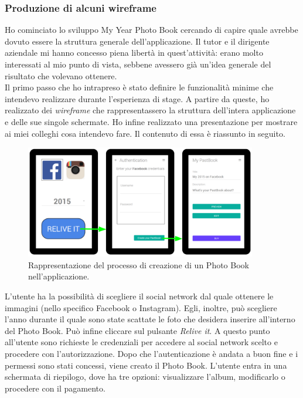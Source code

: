 			\subsubsection{Produzione di alcuni wireframe}
				Ho cominciato lo sviluppo My Year Photo Book cercando di capire quale avrebbe dovuto essere la struttura generale
				dell'applicazione. Il tutor e il dirigente aziendale mi hanno concesso piena libertà in quest'attività: erano molto
				interessati al mio punto di vista, sebbene avessero già un'idea generale del risultato che volevano ottenere.\\
				Il primo passo che ho intrapreso è stato definire le funzionalità minime che intendevo realizzare durante
				l'esperienza di stage. A partire da queste, ho realizzato dei \emph{wireframe} che rappresentassero la struttura
				dell'intera applicazione e delle sue singole schermate. Ho infine realizzato una presentazione per mostrare ai miei
				colleghi cosa intendevo fare. Il contenuto di essa è riassunto in seguito.\\
				\begin{figure}[H]
					\centering
					\includegraphics[width=0.9\textwidth]{capitolo_3/immagini/wireframe_1.png}
					\caption{Rappresentazione del processo di creazione di un Photo Book nell'applicazione.}
				\end{figure}
				\noindent L'utente ha la possibilità di scegliere il social network dal quale ottenere le immagini (nello specifico
				Facebook o Instagram). Egli, inoltre, può scegliere l'anno durante il quale sono state scattate le foto che desidera
				inserire all'interno del Photo Book. Può infine cliccare sul pulsante \emph{Relive it}. A questo punto all'utente
				sono richieste le credenziali per accedere al social network scelto e procedere con l'autorizzazione. Dopo che
				l'autenticazione è andata a buon fine e i permessi sono stati concessi, viene creato il Photo Book. L'utente entra
				in una schermata di riepilogo, dove ha tre opzioni: visualizzare l'album, modificarlo o procedere con il pagamento.

